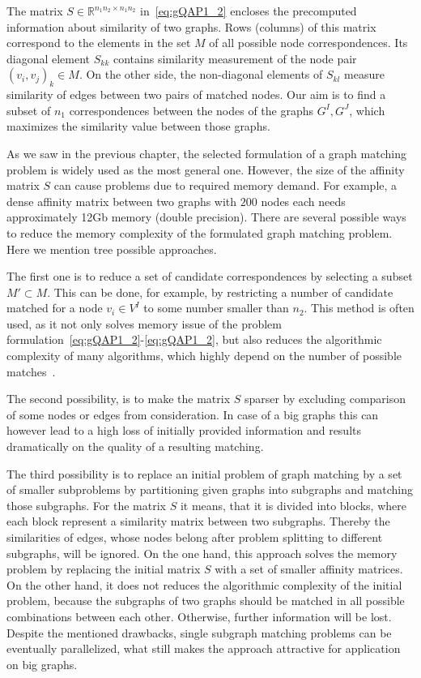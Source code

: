 The matrix $S\in\mathbb{R}^{n_1n_2\times n_1n_2}$ in~\eqref{eq:gQAP1_2} encloses the precomputed information about similarity of two graphs. Rows (columns) of this matrix correspond to the elements in the set $M$ of all possible node correspondences. Its diagonal element $S_{kk}$ contains similarity measurement of the node pair $(v_i,v_j)_k\in M$. On the other side, the non-diagonal elements of $S_{kl}$ measure similarity of edges between two pairs of matched nodes. Our aim is to find a subset of $n_1$ correspondences between the nodes of the graphs $G^I,G^J$, which maximizes the similarity value between those graphs.

As we saw in the previous chapter, the selected formulation of a graph matching problem is widely used as the most general one. However, the size of the affinity matrix $S$ can cause problems due to required memory demand. For example, a dense affinity matrix between two graphs with $200$ nodes each needs approximately 12Gb memory (double precision). There are several possible ways to reduce the memory complexity of the formulated graph matching problem. Here we mention tree possible approaches.

The first one is to reduce a set of candidate correspondences by selecting a subset $M'\subset M$. This can be done, for example, by restricting a number of candidate matched for a node $v_i\in V^I$ to some number smaller than $n_2$. This method is often used, as it not only solves memory issue of the problem formulation~\eqref{eq:gQAP1_2}-\eqref{eq:gQAP1_2}, but also reduces the algorithmic complexity of many algorithms, which highly depend on the number of possible matches~.

The second possibility, is to make the matrix $S$ sparser by excluding comparison of some nodes or edges from consideration. In case of a big graphs this can however lead to a high loss of initially provided information and results dramatically on the quality of a resulting matching. 

The third possibility is to replace an initial problem of graph matching by a set of smaller subproblems by partitioning given graphs into subgraphs and matching those subgraphs. For the matrix $S$ it means, that it is divided into blocks, where each block represent a similarity matrix between two subgraphs. Thereby the similarities of edges, whose nodes belong after problem splitting to different subgraphs, will be ignored. On the one hand, this approach solves the memory problem by replacing the initial matrix $S$ with a set of smaller affinity matrices. On the other hand, it does not reduces the algorithmic complexity of the initial problem, because the subgraphs of two graphs should be matched in all possible combinations between each other. Otherwise, further information will be lost. Despite the mentioned drawbacks, single subgraph matching problems can be eventually parallelized, what still makes the approach attractive for application on big graphs.

